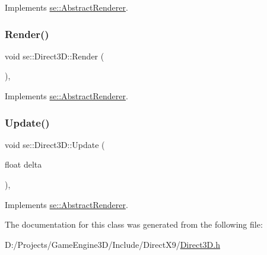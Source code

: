 Implements \mbox{\hyperlink{classse_1_1_abstract_renderer_a98e35b7db62827580573185ed91b25bb}{se\+::\+Abstract\+Renderer}}.

\mbox{\label{classse_1_1_direct3_d_af4e167f88160d79fc66b4d65694b536a}} 
\subsubsection{\texorpdfstring{Render()}{Render()}}
{\footnotesize\ttfamily void se\+::\+Direct3\+D\+::\+Render (\begin{DoxyParamCaption}{ }\end{DoxyParamCaption})\hspace{0.3cm}{\ttfamily [override]}, {\ttfamily [virtual]}}



Implements \mbox{\hyperlink{classse_1_1_abstract_renderer_a08f813c33edad06bf7d379f8257895e6}{se\+::\+Abstract\+Renderer}}.

\mbox{\label{classse_1_1_direct3_d_a39934c194406f108a992d82a4d265381}} 
\subsubsection{\texorpdfstring{Update()}{Update()}}
{\footnotesize\ttfamily void se\+::\+Direct3\+D\+::\+Update (\begin{DoxyParamCaption}\item[{float}]{delta }\end{DoxyParamCaption})\hspace{0.3cm}{\ttfamily [override]}, {\ttfamily [virtual]}}



Implements \mbox{\hyperlink{classse_1_1_abstract_renderer_aae49e7417663d6a5aca34a2bb37b4b28}{se\+::\+Abstract\+Renderer}}.



The documentation for this class was generated from the following file\+:\begin{DoxyCompactItemize}
\item 
D\+:/\+Projects/\+Game\+Engine3\+D/\+Include/\+Direct\+X9/\mbox{\hyperlink{_direct3_d_8h}{Direct3\+D.\+h}}\end{DoxyCompactItemize}
